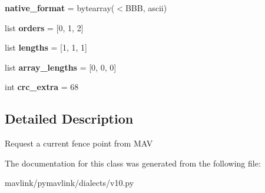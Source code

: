 \begin{DoxyCompactItemize}
{\bfseries native\+\_\+format} = bytearray(\textquotesingle{}$<$B\+BB\textquotesingle{}, \textquotesingle{}ascii\textquotesingle{})
\item 
\mbox{\label{classpymavlink_1_1dialects_1_1v10_1_1MAVLink__fence__fetch__point__message_aa827c174d3790614517500db43e07a61}} 
list {\bfseries orders} = \mbox{[}0, 1, 2\mbox{]}
\item 
\mbox{\label{classpymavlink_1_1dialects_1_1v10_1_1MAVLink__fence__fetch__point__message_aa6476aaad104c6394ba8c4ee51e64efe}} 
list {\bfseries lengths} = \mbox{[}1, 1, 1\mbox{]}
\item 
\mbox{\label{classpymavlink_1_1dialects_1_1v10_1_1MAVLink__fence__fetch__point__message_ad77fedc907472b198375787419204997}} 
list {\bfseries array\+\_\+lengths} = \mbox{[}0, 0, 0\mbox{]}
\item 
\mbox{\label{classpymavlink_1_1dialects_1_1v10_1_1MAVLink__fence__fetch__point__message_a8ab547ec63dbb720e9d1fc6a61ecbe47}} 
int {\bfseries crc\+\_\+extra} = 68
\end{DoxyCompactItemize}


\subsection{Detailed Description}
\begin{DoxyVerb}Request a current fence point from MAV
\end{DoxyVerb}
 

The documentation for this class was generated from the following file\+:\begin{DoxyCompactItemize}
\item 
mavlink/pymavlink/dialects/v10.\+py\end{DoxyCompactItemize}
